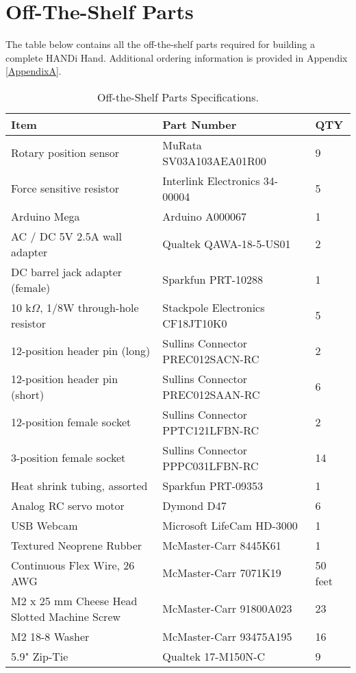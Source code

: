 \section{Off-The-Shelf Parts}
The table below contains all the off-the-shelf parts required for building a complete HANDi Hand. Additional ordering information is provided in Appendix \ref{AppendixA}.
\begin{table}[H]
\centering
\caption{Off-the-Shelf Parts Specifications.\label{ots_parts_table}}
\begin{tabular}{| p{6cm}|  p{7cm} |  p{2cm} |}
\hline
 \textbf{Item} & \textbf{Part Number} & \textbf{QTY}\\ \hline
Rotary position sensor & MuRata SV03A103AEA01R00 & 9 \\ \hline
Force sensitive resistor & Interlink Electronics 34-00004 & 5 \\ \hline
Arduino Mega & Arduino A000067 & 1 \\ \hline
AC / DC 5V 2.5A wall adapter & Qualtek QAWA-18-5-US01 & 2 \\ \hline
DC barrel jack adapter (female) & Sparkfun PRT-10288 &  1 \\ \hline
10 k$\Omega$, 1/8W through-hole resistor & Stackpole Electronics CF18JT10K0 & 5 \\ \hline
12-position header pin (long) & Sullins Connector PREC012SACN-RC & 2 \\ \hline
12-position header pin (short) & Sullins Connector PREC012SAAN-RC & 6 \\ \hline
12-position female socket & Sullins Connector PPTC121LFBN-RC & 2 \\ \hline
3-position female socket & Sullins Connector PPPC031LFBN-RC & 14 \\ \hline
Heat shrink tubing, assorted & Sparkfun PRT-09353 & 1 \\ \hline
Analog RC servo motor & Dymond D47 & 6 \\ \hline
USB Webcam & Microsoft LifeCam HD-3000 & 1 \\ \hline
Textured Neoprene Rubber & McMaster-Carr 8445K61 & 1 \\ \hline
Continuous Flex Wire, 26 AWG & McMaster-Carr 7071K19 & 50 feet \\ \hline
M2 x 25 mm Cheese Head Slotted Machine Screw & McMaster-Carr 91800A023	& 23 \\ \hline
M2 18-8 Washer & McMaster-Carr 93475A195 & 16 \\ \hline
5.9" Zip-Tie & Qualtek 17-M150N-C & 9 \\ \hline
\end{tabular}
\end{table}

